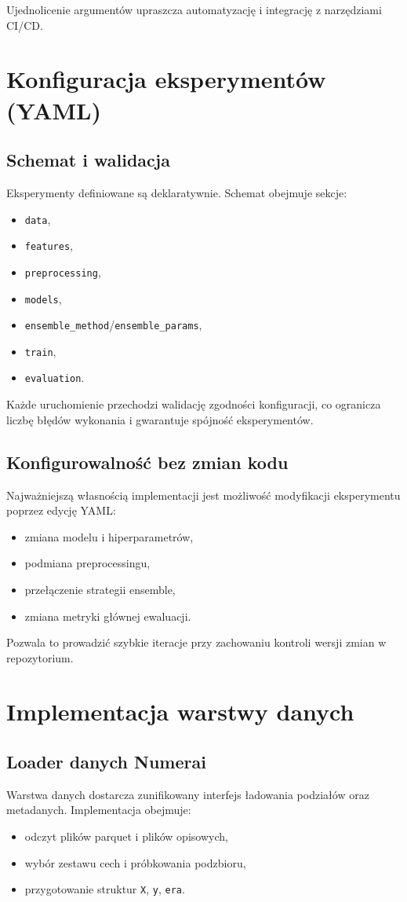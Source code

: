 \documentclass[12pt,a4paper]{report}
\begin{document}
Ujednolicenie argumentów upraszcza automatyzację i integrację z narzędziami CI/CD.

\section{Konfiguracja eksperymentów (YAML)}
\subsection{Schemat i walidacja}
Eksperymenty definiowane są deklaratywnie. Schemat obejmuje sekcje:
\begin{itemize}\item \texttt{data},
\item \texttt{features},
\item \texttt{preprocessing},
\item \texttt{models},
\item \texttt{ensemble\_method}/\texttt{ensemble\_params},
\item \texttt{train},
\item \texttt{evaluation}.\end{itemize}

Każde uruchomienie przechodzi walidację zgodności konfiguracji, co ogranicza liczbę
błędów wykonania i gwarantuje spójność eksperymentów.

\subsection{Konfigurowalność bez zmian kodu}
Najważniejszą własnością implementacji jest możliwość modyfikacji eksperymentu
poprzez edycję YAML:
\begin{itemize}\item zmiana modelu i hiperparametrów,
\item podmiana preprocessingu,
\item przełączenie strategii ensemble,
\item zmiana metryki głównej ewaluacji.\end{itemize}

Pozwala to prowadzić szybkie iteracje przy zachowaniu kontroli wersji zmian
w repozytorium.

\section{Implementacja warstwy danych}
\subsection{Loader danych Numerai}
Warstwa danych dostarcza zunifikowany interfejs ładowania podziałów oraz metadanych.
Implementacja obejmuje:
\begin{itemize}\item odczyt plików parquet i plików opisowych,
\item wybór zestawu cech i próbkowania podzbioru,
\item przygotowanie struktur \texttt{X}, \texttt{y}, \texttt{era}.\end{itemize}
\end{document}
